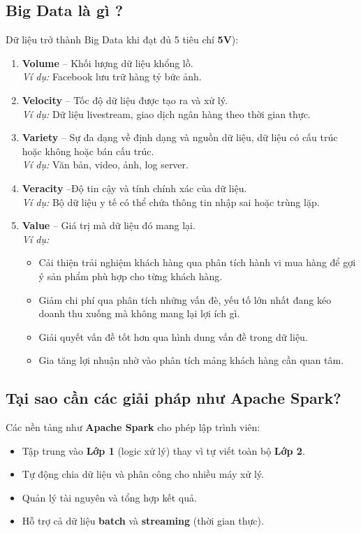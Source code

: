 \documentclass[11pt]{article}
\begin{document}

\subsection{Big Data là gì ?}
Dữ liệu trở thành Big Data khi đạt đủ 5 tiêu chí \textbf{5V}):
\begin{enumerate}
    \item \textbf{Volume} -- Khối lượng dữ liệu khổng lồ. \\
    \textit{Ví dụ:} Facebook lưu trữ hàng tỷ bức ảnh.
    \item \textbf{Velocity} -- Tốc độ dữ liệu được tạo ra và xử lý. \\
    \textit{Ví dụ:} Dữ liệu livestream, giao dịch ngân hàng theo thời gian thực.
    \item \textbf{Variety} -- Sự đa dạng về định dạng và nguồn dữ liệu, dữ liệu có cấu trúc hoặc không hoặc bán cấu trúc. \\
    \textit{Ví dụ:} Văn bản, video, ảnh, log server.
    \item \textbf{Veracity} --Độ tin cậy và tính chính xác của dữ liệu. \\
      \textit{Ví dụ:} Bộ dữ liệu y tế có thể chứa thông tin nhập sai hoặc trùng lặp.

    \item \textbf{Value} -- Giá trị mà dữ liệu đó mang lại. \\
    \textit{Ví dụ:}
	\begin{itemize}
		\item Cải thiện trải nghiệm khách hàng qua phân tích hành vi mua hàng để gợi ý sản phẩm phù hợp cho từng khách hàng.
		\item Giảm chi phí qua phân tích những vấn đè, yếu tố lớn nhất đang kéo doanh thu xuống mà không mang lại lợi ích gì.
		\item Giải quyết vấn đề tốt hơn qua hình dung vấn đề trong dữ liệu.
		\item Gia tăng lợi nhuận nhờ vào phân tích mảng khách hàng cần quan tâm.
	\end{itemize}

\end{enumerate}

\subsection{Tại sao cần các giải pháp như Apache Spark?}
Các nền tảng như \textbf{Apache Spark} cho phép lập trình viên:
\begin{itemize}
    \item Tập trung vào \textbf{Lớp 1} (logic xử lý) thay vì tự viết toàn bộ \textbf{Lớp 2}.
    \item Tự động chia dữ liệu và phân công cho nhiều máy xử lý.
    \item Quản lý tài nguyên và tổng hợp kết quả.
    \item Hỗ trợ cả dữ liệu \textbf{batch} và \textbf{streaming} (thời gian thực).
\end{itemize}
\end{document}

